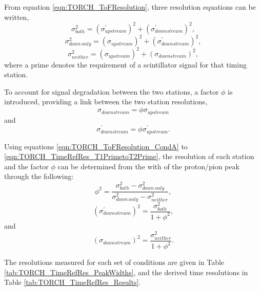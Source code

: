 From equation \ref{eqn:TORCH_ToFResolution}, three resolution equations can be written,
\begin{equation}
\label{eqn:TORCH_ToFResolution_CondA}
\sigma_{both}^{2} = (\sigma_{upstream}^{\prime} )^{2} + (\sigma_{downstream}^{\prime} )^{2},
\end{equation}
\begin{equation}
\label{eqn:TORCH_ToFResolution_CondB}
\sigma_{down\,only}^{2} = (\sigma_{upstream} )^{2} + (\sigma_{downstream}^{\prime} )^{2},
\end{equation}
\begin{equation}
\label{eqn:TORCH_ToFResolution_CondC}
\sigma_{neither}^{2} = (\sigma_{upstream} )^{2} + (\sigma_{downstream} )^{2},
\end{equation}
where a prime denotes the requirement of a scintillator signal for that timing station.

To account for signal degradation between the two stations, a factor $\phi$ is introduced, providing a link between the two station resolutions,
\begin{equation}
\label{eqn:TORCH_TimeRefRes_T1toT2}
\sigma_{downstream} = \phi\sigma_{upstream}
\end{equation}
and 
\begin{equation}
\label{eqn:TORCH_TimeRefRes_T1PrimetoT2Prime}
\sigma_{downstream}^{\prime} = \phi\sigma_{upstream}^{\prime}.
\end{equation}

Using equations \ref{eqn:TORCH_ToFResolution_CondA} to \ref{eqn:TORCH_TimeRefRes_T1PrimetoT2Prime}, the resolution of each station and the factor $\phi$ can be determined from the with of the proton/pion peak through the following:
\begin{equation}
\phi^{2} = \frac{\sigma_{both}^{2} - \sigma_{down\,only}^{2}}{\sigma_{down\,only}^{2} - \sigma_{neither}^{2}},
\end{equation}
\begin{equation}
(\sigma_{downstream}^{\prime} )^{2} = \frac{\sigma_{both}^{2} }{1 + \phi^{2}},
\end{equation}
and
\begin{equation}
(\sigma_{downstream})^{2} = \frac{\sigma_{neither}^{2} }{1 + \phi^{2}}.
\end{equation}

The resolutions measured for each set of conditions are given in Table \ref{tab:TORCH_TimeRefRes_PeakWidths}, and the derived time resolutions in Table \ref{tab:TORCH_TimeRefRes_Results}.

